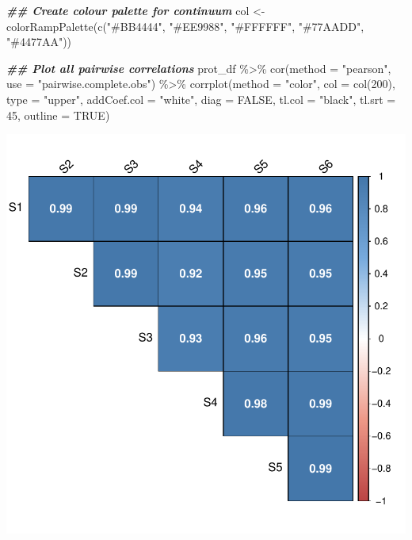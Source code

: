 \documentclass[9pt,a4paper,]{extarticle}
\newenvironment{Shaded}{\begin{snugshade}}{\end{snugshade}}
\newcommand{\AttributeTok}[1]{\textcolor[rgb]{0.77,0.63,0.00}{#1}}
\newcommand{\ConstantTok}[1]{\textcolor[rgb]{0.00,0.00,0.00}{#1}}
\newcommand{\DecValTok}[1]{\textcolor[rgb]{0.00,0.00,0.81}{#1}}
\newcommand{\DocumentationTok}[1]{\textcolor[rgb]{0.56,0.35,0.01}{\textbf{\textit{#1}}}}
\newcommand{\FunctionTok}[1]{\textcolor[rgb]{0.00,0.00,0.00}{#1}}
\newcommand{\NormalTok}[1]{#1}
\newcommand{\OtherTok}[1]{\textcolor[rgb]{0.56,0.35,0.01}{#1}}
\newcommand{\SpecialCharTok}[1]{\textcolor[rgb]{0.00,0.00,0.00}{#1}}
\newcommand{\StringTok}[1]{\textcolor[rgb]{0.31,0.60,0.02}{#1}}
\begin{document}
\begin{Shaded}
\begin{Highlighting}[]
\DocumentationTok{\#\# Create colour palette for continuum}
\NormalTok{col }\OtherTok{\textless{}{-}} \FunctionTok{colorRampPalette}\NormalTok{(}\FunctionTok{c}\NormalTok{(}\StringTok{"\#BB4444"}\NormalTok{, }\StringTok{"\#EE9988"}\NormalTok{, }\StringTok{"\#FFFFFF"}\NormalTok{,}
                          \StringTok{"\#77AADD"}\NormalTok{, }\StringTok{"\#4477AA"}\NormalTok{))}

\DocumentationTok{\#\# Plot all pairwise correlations}
\NormalTok{prot\_df }\SpecialCharTok{\%\textgreater{}\%}
  \FunctionTok{cor}\NormalTok{(}\AttributeTok{method =} \StringTok{"pearson"}\NormalTok{, }
      \AttributeTok{use =} \StringTok{"pairwise.complete.obs"}\NormalTok{) }\SpecialCharTok{\%\textgreater{}\%}
  \FunctionTok{corrplot}\NormalTok{(}\AttributeTok{method =} \StringTok{"color"}\NormalTok{,}
           \AttributeTok{col =} \FunctionTok{col}\NormalTok{(}\DecValTok{200}\NormalTok{), }
           \AttributeTok{type =} \StringTok{"upper"}\NormalTok{, }
           \AttributeTok{addCoef.col =} \StringTok{"white"}\NormalTok{,}
           \AttributeTok{diag =} \ConstantTok{FALSE}\NormalTok{, }
           \AttributeTok{tl.col =} \StringTok{"black"}\NormalTok{, }
           \AttributeTok{tl.srt =} \DecValTok{45}\NormalTok{, }
           \AttributeTok{outline =} \ConstantTok{TRUE}\NormalTok{)}
\end{Highlighting}
\end{Shaded}

\begin{center}\includegraphics[height=0.3\textheight]{workflow_expressions_files/figure-latex/correlation_plot_3-1} \end{center}
\end{document}
